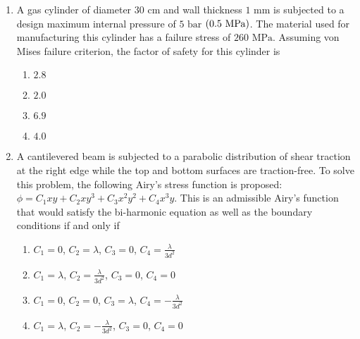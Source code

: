 \documentclass[journal,12pt,twocolumn]{IEEEtran}
\theoremstyle{remark}
\begin{document}
\begin{enumerate}[start=40]
    \item A gas cylinder  of diameter $30 \text{ cm}$ and wall thickness $1 \text{ mm}$ is subjected to a design maximum internal pressure of $5 \text{ bar}$ $\left(0.5 \text{ MPa}\right)$. The material used for manufacturing this cylinder has a failure stress of $260 \text{ MPa}$. Assuming von Mises failure criterion, the factor of safety  for this cylinder is
    \begin{enumerate}
        \item $2.8$
        \item $2.0$
        \item $6.9$
        \item $4.0$
    \end{enumerate}

    \item A cantilevered beam is subjected to a parabolic distribution of shear traction at the right edge while the top and bottom surfaces are traction-free. To solve this problem, the following Airy's stress function is proposed: $\phi = C_1 xy + C_2 xy^3 + C_3 x^2 y^2 + C_4 x^3 y$. This is an admissible Airy's function that would satisfy the bi-harmonic equation as well as the boundary conditions if and only if



    \begin{enumerate}
        \item $C_1 = 0$, $C_2 = \lambda$, $C_3 = 0$, $C_4 = \frac{\lambda}{3d^2}$
        \item $C_1 =\lambda$, $C_2 = \frac{\lambda}{3d^2}$, $C_3 = 0$, $C_4 = 0$
        \item $C_1 = 0$, $C_2 = 0$, $C_3 = \lambda$, $C_4 = -\frac{\lambda}{3d^2}$
        \item $C_1 = \lambda$, $C_2 = -\frac{\lambda}{3d^2}$, $C_3 = 0$, $C_4 = 0$
    \end{enumerate}


\end{enumerate}
\end{document}
